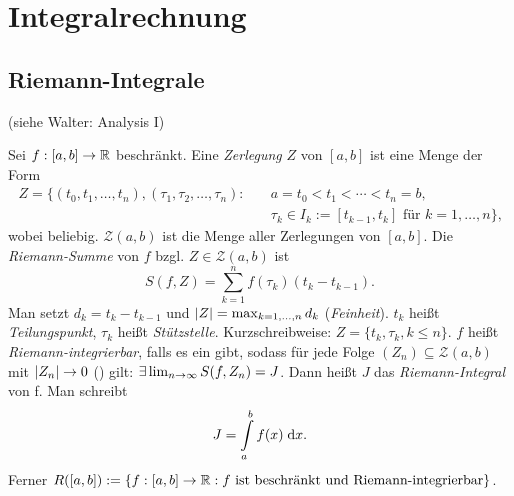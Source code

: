 \documentclass[12pt]{scrreprt}
\begin{document}
\begin{bsp}\label{}

\end{bsp}

\chapter{Integralrechnung}
\label{cha:int}

\section{Riemann-Integrale}
\label{sec:int.riemann}

\noindent (siehe Walter: Analysis I)

\begin{dfn}
  \label{dfn:int.r-int}
  Sei $f: [a,b]\rightarrow\mathbb{R}$ beschränkt. Eine \emph{Zerlegung} $Z$ von
  $[a,b]$ ist eine Menge der Form
  \begin{align*}
    Z = \{(t_0,t_1,\dotsc,t_n),(\tau_1,\tau_2,\dotsc,\tau_n) : \quad
    &a=t_0<t_1<\dotsb<t_n=b, \\
    &\tau_k\in I_k:=[t_{k-1},t_k]\text{ für } k=1,\dotsc,n\}\text{,}
  \end{align*}
  wobei  beliebig. $\mathcal{Z}(a,b)$ ist die Menge aller
  Zerlegungen von $[a,b]$. Die \emph{Riemann-Summe} von $f$
  bzgl. $Z\in\mathcal{Z}(a,b)$ ist
  \[S(f,Z)=\sum_{k=1}^n{f(\tau_k)(t_k-t_{k-1})}.\]
  Man setzt $d_k=t_k-t_{k-1}$ und $\left\lvert Z\right\lvert=\max_{k=1,\dotsc,n}{d_k}$
  (\emph{Feinheit}). $t_k$ heißt \emph{Teilungspunkt}, $\tau_k$ heißt
  \emph{Stützstelle}. Kurzschreibweise: $Z=\{t_k,\tau_k,k\le n\}$. $f$
  heißt \emph{Riemann-integrierbar}, falls es ein  gibt,
  sodass für jede Folge $(Z_n)\subseteq\mathcal{Z}(a,b)$  mit
  $\left\lvert Z_n\right\lvert\to0$ (\ninf) gilt:
  $\exists\lim_{n\rightarrow\infty}{S(f,Z_n)}=J$. Dann heißt $J$ das
  \emph{Riemann-Integral} von f. Man schreibt
  \[J=\int\limits_{a}^{b}{f(x)}\;\mathrm{d}x.\]
  Ferner $R([a,b]):=\{f:[a,b]\rightarrow\mathbb{R}: f\text{ ist beschränkt und Riemann-integrierbar}\}$.
\end{dfn}

\end{document}
